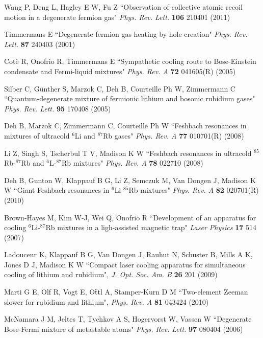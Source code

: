 \documentclass[pra,letterpaper,twocolumn,showpacs,superscriptaddress]{revtex4}
\begin{document}
\begin{thebibliography}{300}
 Wang P, Deng L, Hagley E W, Fu Z
``Observation of collective atomic recoil motion in a degenerate fermion gas"
{\it Phys. Rev. Lett.} \textbf{106} 210401 (2011)

 Timmermans E ``Degenerate fermion gas heating by hole creation" 
{\it Phys. Rev. Lett.} \textbf{87} 240403 (2001)

 Cot\`e R, Onofrio R, Timmermans E 
``Sympathetic cooling route to Bose-Einstein condensate and Fermi-liquid mixtures" {\it Phys. Rev. A} \textbf{72} 041605(R) (2005)

 Silber C, G\"unther S, Marzok C, Deh B, Courteille Ph W, Zimmermann C 
``Quantum-degenerate mixture of fermionic lithium and bosonic rubidium gases" 
{\it Phys. Rev. Lett.} \textbf{95} 170408 (2005)

 Deh B, Marzok C, Zimmermann C, Courteille Ph W  
``Feshbach resonances in mixtures of ultracold ${}^6$Li and ${}^{87}$Rb gases" 
{\it Phys. Rev. A} \textbf{77} 010701(R) (2008)

 Li Z, Singh S, Tscherbul T V, Madison K W 
``Feshbach resonances in ultracold ${}^{85}$Rb-${}^{87}$Rb and ${}^{6}$L-${}^{87}$Rb mixtures"
{\it Phys. Rev. A} \textbf{78} 022710 (2008)

 Deh B, Gunton W, Klappauf B G, Li Z, Semczuk M, Van Dongen J, Madison K W
``Giant Feshbach resonances in ${}^{6}$Li-${}^{85}$Rb mixtures" 
{\it Phys. Rev. A} \textbf{82} 020701(R) (2010)

 Brown-Hayes M, Kim W-J, Wei Q, Onofrio R
``Development of an apparatus for cooling ${}^{6}$Li-${}^{87}$Rb mixtures in a ligh-assisted magnetic trap" 
{\it Laser Physics} \textbf{17} 514 (2007)

 Ladouceur K, Klappauf B G, Van Dongen J, Rauhut N, Schuster B, Mills A K, Jones D J, Madison K W 
``Compact laser cooling apparatus for simultaneous cooling of lithium and rubidium", 
{\it J. Opt. Soc. Am. B} \textbf{26} 201 (2009)

 Marti G E, Olf R, Vogt E, O\"ttl A, Stamper-Kurn D M 
``Two-element Zeeman slower for rubidium and lithium", {\it Phys. Rev. A} \textbf{81} 043424 (2010)

 McNamara J M, Jeltes T, Tychkov A S, Hogervorst W, Vassen W
``Degenerate Bose-Fermi mixture of metastable atoms" {\it Phys. Rev. Lett.} \textbf{97} 080404 (2006)


\end{thebibliography}
\end{document}
